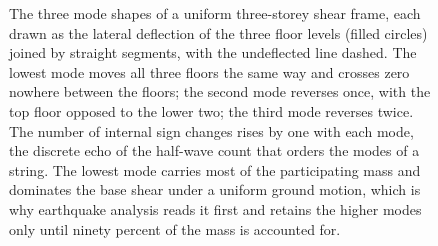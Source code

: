 \begin{figure}[htbp]
\caption[Mode shapes of a three-storey shear frame]{The three mode
shapes of a uniform three-storey shear frame, each drawn as the lateral
deflection of the three floor levels (filled circles) joined by straight
segments, with the undeflected line dashed. The lowest mode moves all
three floors the same way and crosses zero nowhere between the floors;
the second mode reverses once, with the top floor opposed to the lower
two; the third mode reverses twice. The number of internal sign changes
rises by one with each mode, the discrete echo of the half-wave count
that orders the modes of a string. The lowest mode carries most of the
participating mass and dominates the base shear under a uniform ground
motion, which is why earthquake analysis reads it first and retains the
higher modes only until ninety percent of the mass is accounted for.}
\label{fig:vol03ch06:3dof-modes}
\end{figure}
